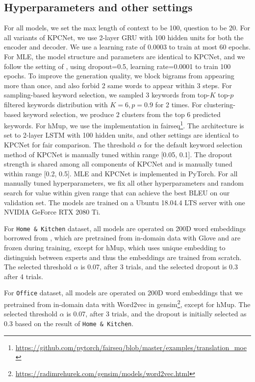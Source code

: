 \subsection{Hyperparameters and other settings}
For all models, we set the max length of context to be 100, question to be 20. For all variants of KPCNet, we use 2-layer GRU \citep{cho2014learning} with 100 hidden units for both the encoder and decoder. We use a learning rate of 0.0003 to train at most 60 epochs. For MLE, the model structure and parameters are identical to KPCNet, and we follow the setting of \citet{rao2019answer}, using dropout=0.5, learning rate=0.0001 to train 100 epochs. To improve the generation quality, we block bigrams from appearing more than once, and also forbid 2 same words to appear within 3 steps. For sampling-based keyword selection, we sampled 3 keywords from top-$K$ top-$p$ filtered keywords distribution with $K=6, p=0.9$ for 2 times. For clustering-based keyword selection, we produce 2 clusters from the top 6 predicted keywords. For hMup, we use the implementation in fairseq\footnote{\url{https://github.com/pytorch/fairseq/blob/master/examples/translation_moe}}. The architecture is set to 2-layer LSTM \citep{hochreiter1997long} with 100 hidden units, and other settings are identical to KPCNet for fair comparison. The threshold $\alpha$ for the default keyword selection method of KPCNet is manually tuned within range [0.05, 0.1]. The dropout strength is shared among all components of KPCNet and is manually tuned within range [0.2, 0.5]. MLE and KPCNet is implemented in PyTorch. For all manually tuned hyperparameters, we fix all other hyperparameters and random search for value within given range that can achieve the best BLEU on our validation set. The models are trained on a Ubuntu 18.04.4 LTS server with one NVIDIA GeForce RTX 2080 Ti. 

For \texttt{Home \& Kitchen} dataset, all models are operated on 200D word embeddings borrowed from \citet{rao2019answer}, which are pretrained from in-domain data with Glove \citep{pennington2014glove} and are frozen during training, except for hMup, which uses unique embedding to distinguish between experts and thus the embeddings are trained from scratch. The selected threshold $\alpha$ is 0.07, after 3 trials, and the selected dropout is 0.3 after 4 trials. 


For \texttt{Office} dataset, all models are operated on 200D word embeddings that we pretrained from in-domain data with Word2vec\citep{mikolov2013distributed} in gensim\footnote{\url{https://radimrehurek.com/gensim/models/word2vec.html}}, except for hMup. The selected threshold $\alpha$ is 0.07, after 3 trials, and the dropout is initially selected as 0.3 based on the result of \texttt{Home \& Kitchen}.

